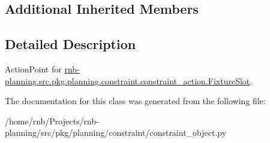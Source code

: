 \subsection*{Additional Inherited Members}


\subsection{Detailed Description}
Action\+Point for \hyperlink{classrnb-planning_1_1src_1_1pkg_1_1planning_1_1constraint_1_1constraint__action_1_1_fixture_slot}{rnb-\/planning.\+src.\+pkg.\+planning.\+constraint.\+constraint\+\_\+action.\+Fixture\+Slot}. 

The documentation for this class was generated from the following file\+:\begin{DoxyCompactItemize}
\item 
/home/rnb/\+Projects/rnb-\/planning/src/pkg/planning/constraint/constraint\+\_\+object.\+py\end{DoxyCompactItemize}
